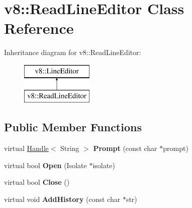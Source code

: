 \hypertarget{classv8_1_1_read_line_editor}{}\section{v8\+:\+:Read\+Line\+Editor Class Reference}
\label{classv8_1_1_read_line_editor}
Inheritance diagram for v8\+:\+:Read\+Line\+Editor\+:\begin{figure}[H]
\begin{center}
\leavevmode
\includegraphics[height=2.000000cm]{classv8_1_1_read_line_editor}
\end{center}
\end{figure}
\subsection*{Public Member Functions}
\begin{DoxyCompactItemize}
\item 
\hypertarget{classv8_1_1_read_line_editor_a2da1006dcd11cc5d564b16269987ddb1}{}virtual \hyperlink{classv8_1_1_handle}{Handle}$<$ String $>$ {\bfseries Prompt} (const char $\ast$prompt)\label{classv8_1_1_read_line_editor_a2da1006dcd11cc5d564b16269987ddb1}

\item 
\hypertarget{classv8_1_1_read_line_editor_a8bb21d2690ae3400062046b2ae0be18e}{}virtual bool {\bfseries Open} (Isolate $\ast$isolate)\label{classv8_1_1_read_line_editor_a8bb21d2690ae3400062046b2ae0be18e}

\item 
\hypertarget{classv8_1_1_read_line_editor_a77f1740fc44d7e96871d7211a1d6d482}{}virtual bool {\bfseries Close} ()\label{classv8_1_1_read_line_editor_a77f1740fc44d7e96871d7211a1d6d482}

\item 
\hypertarget{classv8_1_1_read_line_editor_aa710048c3c5ee848d551e4ac38b133ba}{}virtual void {\bfseries Add\+History} (const char $\ast$str)\label{classv8_1_1_read_line_editor_aa710048c3c5ee848d551e4ac38b133ba}

\end{DoxyCompactItemize}
